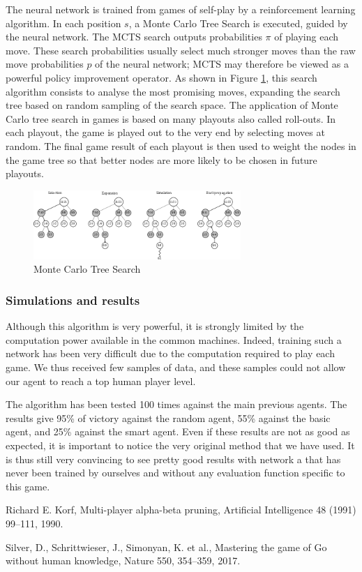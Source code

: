 \documentclass[journal,onecolumn]{IEEEtran}
\begin{document}
The neural network is trained from games of self-play by a reinforcement learning algorithm. In each position $s$, a Monte Carlo Tree Search is executed, guided by the neural network. The MCTS search outputs probabilities \(\pi\) of playing each move. These search probabilities usually select much stronger moves than the raw move probabilities $p$ of the neural network; MCTS may therefore be viewed as a powerful policy improvement operator. As shown in Figure \ref{fig:mcts}, this search algorithm consists to analyse the most promising moves, expanding the search tree based on random sampling of the search space. The application of Monte Carlo tree search in games is based on many playouts also called roll-outs. In each playout, the game is played out to the very end by selecting moves at random. The final game result of each playout is then used to weight the nodes in the game tree so that better nodes are more likely to be chosen in future playouts.

\begin{figure}[H]
    \centering
    \includegraphics[width=0.7\textwidth]{img/mcts.png}
    \caption{Monte Carlo Tree Search}
    \label{fig:mcts}
\end{figure}

\subsubsection*{Simulations and results}

Although this algorithm is very powerful, it is strongly limited by the computation power available in the common machines. Indeed, training such a network has been very difficult due to the computation required to play each game. We thus received few samples of data, and these samples could not allow our agent to reach a top human player level.

The algorithm has been tested 100 times against the main previous agents. The results give 95\% of victory against the random agent, 55\% against the basic agent, and 25\% against the smart agent. Even if these results are not as good as expected, it is important to notice the very original method that we have used. It is thus still very convincing to see pretty good results with network a that has never been trained by ourselves and without any evaluation function specific to this game.

\begin{thebibliography}{9}
Richard E. Korf, Multi-player alpha-beta pruning, Artificial Intelligence 48 (1991) 99--111, 1990.

Silver, D., Schrittwieser, J., Simonyan, K. et al., Mastering the game of Go without human knowledge, Nature 550, 354–359, 2017.
\end{thebibliography}
\end{document}
